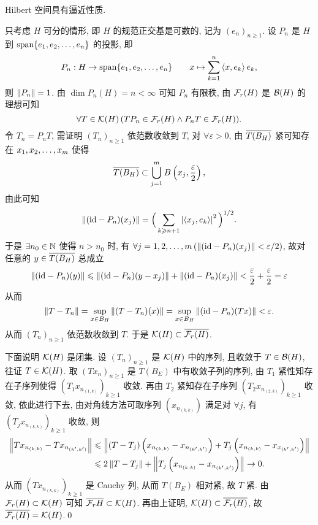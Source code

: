     \begin{Theorem}
        Hilbert 空间具有逼近性质.
    \end{Theorem}
    \begin{Proof}
        只考虑 $ H $ 可分的情形, 即 $ H $ 的规范正交基是可数的, 记为 $ (e_{n})_{n\geqslant1} $. 设 $ P_{n} $ 是 $ H $ 到 $ \Span\{ \seq{e} \} $ 的投影, 即
        \[
            P_{n}: H\to\Span\{ \seq{e} \}\qquad x\mapsto \sum_{k=1}^{n}\lrangle{x, e_{k}}e_{k},
        \]
        则 $ \norm{P_{n}}=1 $. 由 $ \dim P_{n}(H)=n<\infty $ 可知 $ P_{n} $ 有限秩, 由 $ \Fr(H) $ 是 $ \CB(H) $ 的理想可知
        \[
            \forall T\in\CK(H)\,(TP_{n}\in\Fr(H)\land P_{n}T\in\Fr(H)).
        \]
        令 $ T_{n}=P_{n}T $, 需证明 $ (T_{n})_{n\geqslant1} $ 依范数收敛到 $ T $, 对 $ \forall\varepsilon>0 $, 由 $ \baro{T(B_{H})} $ 紧可知存在 $ \seq[m]{x} $ 使得
        \[
            \baro{T(B_{H})}\subset\bigcup_{j=1}^{m}B\left(x_{j}, \frac{\varepsilon}{2}\right),
        \]
        由此可知
        \[
            \norm{(\id -P_{n})(x_{j})}=\Big( \sum_{k\geqslant n+1} \abs{\lrangle{x_{j}, e_{k}}}^{2} \Big)^{1/2}.
        \]
        于是 $ \exists n_{0}\in\N $ 使得 $ n>n_{0} $ 时, 有 $ \forall j= 1, 2, \dots, m\,(\norm{(\id-P_{n})(x_{j})}<\varepsilon/2) $, 故对任意的 $ y\in\baro{T(B_{H})} $ 总成立
        \[
            \norm{(\id-P_{n})(y)}\leqslant\norm{(\id-P_{n})(y-x_{j})}+\norm{(\id-P_{n})(x_{j})}<\frac{\varepsilon}{2}+\frac{\varepsilon}{2}=\varepsilon
        \]
        从而
        \[
            \norm{T-T_{n}}=\sup_{x\in B_{H}}\norm{(T-T_{n})(x)}=\sup_{x\in B_{H}}\norm{(\id-P_{n})(Tx)}<\varepsilon.
        \]
        从而 $ (T_{n})_{n\geqslant1} $ 依范数收敛到 $ T $. 于是 $ \CK(H)\subset\baro{\Fr(H)} $.

        下面说明 $ \CK(H) $ 是闭集. 设 $ (T_{n})_{n\geqslant1} $ 是 $ \CK(H) $ 中的序列, 且收敛于 $ T\in\CB(H) $, 往证 $ T\in\CK(H) $. 取 $ (Tx_{n})_{n\geqslant1} $ 是 $ T(B_{E}) $ 中有收敛子列的序列, 由 $ T_{1} $ 紧性知存在子序列使得 $ \left(T_{1}x_{n_{(1, k)}}\right)_{k\geqslant1} $ 收敛. 再由 $ T_{2} $ 紧知存在子序列 $ \left(T_{2}x_{n_{(2, k)}}\right)_{k\geqslant1} $ 收敛, 依此进行下去, 由对角线方法可取序列 $ \left(x_{n_{(k, k)}}\right) $ 满足对 $ \forall j $, 有 $ \left(T_{j}x_{n_{(k, k)}}\right)_{k\geqslant1} $ 收敛, 则
        \[
            \begin{aligned}
                \norm{Tx_{n_{(k, k)}}-Tx_{n_{(k', k')}}} & \leqslant \norm{(T-T_{j})\left(x_{n_{(k, k)}}-x_{n_{(k', k')}}\right)+T_{j}\left(x_{n_{(k, k)}}-x_{x_{(k', k')}}\right)}\\
                & \leqslant 2\norm{T-T_{j}}+\norm{T_{j}\left(x_{n_{(k, k)}}-x_{n_{(k', k')}}\right)}\to 0.
            \end{aligned}
        \]
        从而 $ \left( Tx_{n_{(k, k)}} \right)_{k\geqslant1} $ 是 Cauchy 列, 从而 $ T(B_{E}) $ 相对紧, 故 $ T $ 紧. 由 $ \Fr(H)\subset\CK(H) $ 可知 $ \baro{\Fr{H}}\subset \CK(H) $. 再由上证明, $ \CK(H)\subset\baro{\Fr(H)} $, 故 $ \baro{\Fr(H)}=\CK(H) $.\qed
    \end{Proof}

